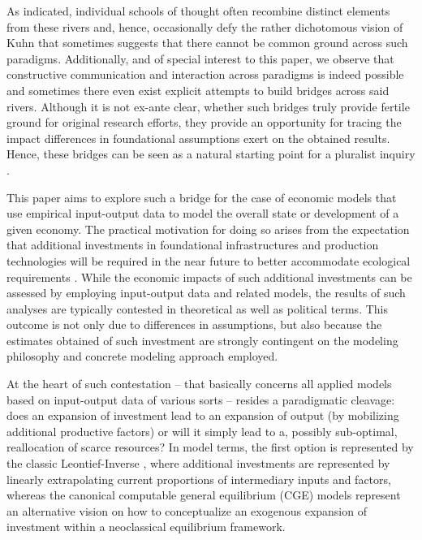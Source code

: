 As indicated, individual schools of thought often recombine distinct elements from these rivers and, hence, occasionally defy the rather dichotomous vision of Kuhn that sometimes suggests that there cannot be common ground across such paradigms. Additionally, and of special interest to this paper, we observe that constructive communication and interaction across paradigms is indeed possible and sometimes there even exist explicit attempts to build bridges across said rivers. Although it is not ex-ante clear, whether such bridges truly provide fertile ground for original research efforts, they provide an opportunity for tracing the impact differences in foundational assumptions exert on the obtained results. Hence, these bridges can be seen as a natural starting point for a pluralist inquiry \citep[see also][]{Dobusch.2012}.

This paper aims to explore such a bridge for the case of economic models that use empirical input-output data to model the overall state or development of a given economy. The practical motivation for doing so arises from the expectation that additional investments in foundational infrastructures and production technologies will be required in the near future to better accommodate ecological requirements \citep[e.g.][]{Creutzig.2018,He.2023,Hornykewycz.2025}. While the economic impacts of such additional investments can be assessed by employing input-output data and related models, the results of such analyses are typically contested in theoretical as well as political terms. This outcome is not only due to differences in assumptions, but also because the estimates obtained of such investment are strongly contingent on the modeling philosophy and concrete modeling approach employed. 

At the heart of such contestation -- that basically concerns all applied models based on input-output data of various sorts -- resides a paradigmatic cleavage: does an expansion of investment lead to an expansion of output (by mobilizing additional productive factors) or will it simply lead to a, possibly sub-optimal, reallocation of scarce resources? In model terms, the first option is represented by the classic Leontief-Inverse \citep{Leontief.1936,leontief1986input,BlairMiller}, where additional investments are represented by linearly extrapolating current proportions of intermediary inputs and factors, whereas the canonical computable general equilibrium (CGE) models represent an alternative vision on how to conceptualize an exogenous expansion of investment within a neoclassical equilibrium framework.

